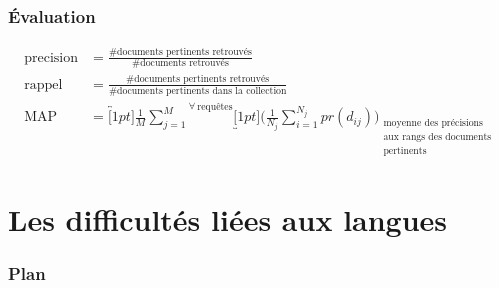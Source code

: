 \documentclass[12pt,aspectratio=43,dvipsnames,table]{beamer}
\begin{document}
\begin{frame}
    \frametitle{\'Evaluation}

    \begin{align*}
    \text{precision} & = \frac{\text{\# documents pertinents retrouvés}}
                              {\text{\# documents retrouvés}}
                              \\[1.5em]
    \text{rappel} & = \frac{\text{\# documents pertinents retrouvés}}
                           {\text{\# documents pertinents dans la collection}}
                           \\[1.5em]
    \text{MAP} & = \overbracket[1pt]{
                      \frac{1}{M} \sum_{j=1}^{M}
                   }^{\forall~\text{requêtes}} 
                   \underbracket[1pt]{
                    \Bigg( \frac{1}{N_j} \sum_{i=1}^{N_j} pr(d_{ij}) \Bigg)
                   }_{
                      \substack{
                        \text{moyenne des précisions} \\ 
                        \text{aux rangs des documents} \\ 
                        \text{pertinents}
                      }
                    }
    \end{align*}

\end{frame}


\section{Les difficultés liées aux langues}


\begin{frame}
\frametitle{Plan}
\tableofcontents[sectionstyle=show,subsectionstyle=hide,subsubsectionstyle=hide]
\end{frame}
\end{document}
